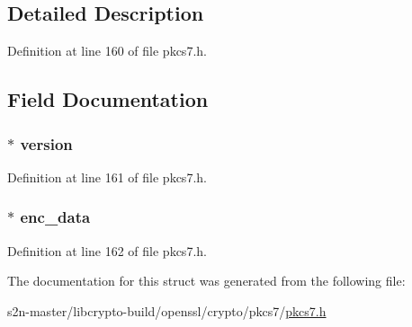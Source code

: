 \subsection{Detailed Description}


Definition at line 160 of file pkcs7.\+h.



\subsection{Field Documentation}
\subsubsection[{\texorpdfstring{version}{version}}]{ $\ast$ version}\hypertarget{structpkcs7__encrypted__st_abf367aeef355b6acf5be7c569c4b28b0}{}\label{structpkcs7__encrypted__st_abf367aeef355b6acf5be7c569c4b28b0}


Definition at line 161 of file pkcs7.\+h.

\subsubsection[{\texorpdfstring{enc\+\_\+data}{enc_data}}]{ $\ast$ enc\+\_\+data}\hypertarget{structpkcs7__encrypted__st_a39e0a8da41ac4871f293d76368a9a0e7}{}\label{structpkcs7__encrypted__st_a39e0a8da41ac4871f293d76368a9a0e7}


Definition at line 162 of file pkcs7.\+h.



The documentation for this struct was generated from the following file\+:\begin{DoxyCompactItemize}
\item 
s2n-\/master/libcrypto-\/build/openssl/crypto/pkcs7/\hyperlink{crypto_2pkcs7_2pkcs7_8h}{pkcs7.\+h}\end{DoxyCompactItemize}
